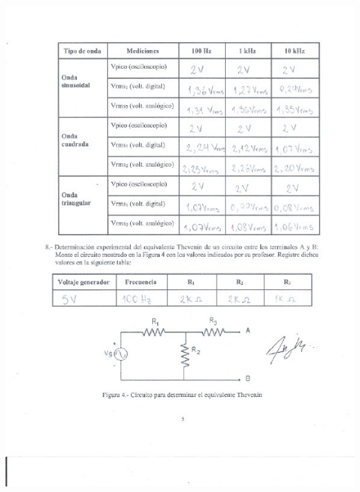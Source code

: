 \documentclass[12pt]{article}
\begin{document}
	\includegraphics[width=16cm,height=21cm]{Img/Resultados_3}\\
\end{document}
